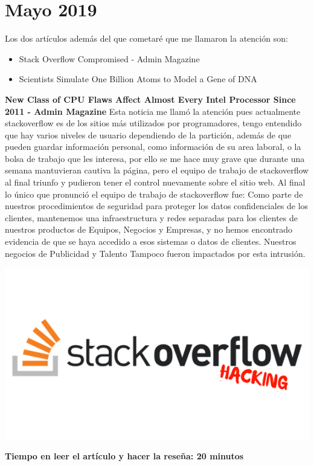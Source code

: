 \documentclass[a4paper, 11pt, oneside]{article}
\begin{document}
\section*{Mayo 2019}
Los dos artículos además del que cometaré que me llamaron la atención son:
\begin{itemize}
    \item Stack Overflow Compromised - Admin Magazine
    \item Scientists Simulate One Billion Atoms to Model a Gene of DNA
\end{itemize}
\textbf{New Class of CPU Flaws Affect Almost Every Intel Processor Since 2011 - Admin Magazine}
Esta noticia me llamó la atención pues actualmente stackoverflow es de los sitios más utilizados por programadores, tengo entendido que hay varios niveles de usuario dependiendo de la partición, además de que pueden guardar información personal, como información de su area laboral, o la bolsa de trabajo que les interesa, por ello se me hace muy grave que durante una semana mantuvieran cautiva la página, pero el equipo de trabajo de stackoverflow al final triunfo y pudieron tener el control nuevamente sobre el sitio web. Al final lo único que pronunció el equipo de trabajo de stackoverflow fue: Como parte de nuestros procedimientos de seguridad para proteger los datos confidenciales de los clientes, mantenemos una infraestructura y redes separadas para los clientes de nuestros productos de Equipos, Negocios y Empresas, y no hemos encontrado evidencia de que se haya accedido a esos sistemas o datos de clientes. Nuestros negocios de Publicidad y Talento Tampoco fueron impactados por esta intrusión.

\begin{center}
    \includegraphics[scale=0.40]{stack.png}
\end{center}
\textbf{Tiempo en leer el artículo y hacer la reseña: 20 minutos}
\end{document}
